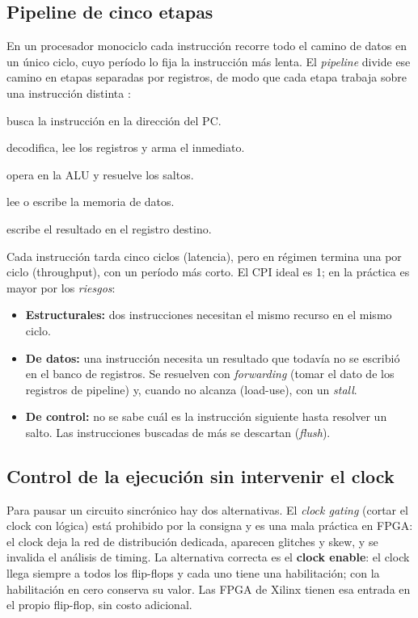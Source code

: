 \documentclass[12pt,a4paper]{article}
\begin{document}
\subsection{Pipeline de cinco etapas}

En un procesador monociclo cada instrucción recorre todo el camino de datos en
un único ciclo, cuyo período lo fija la instrucción más lenta. El
\emph{pipeline} divide ese camino en etapas separadas por registros, de modo que
cada etapa trabaja sobre una instrucción distinta \cite{patterson}:

\begin{description}[nosep,leftmargin=1.5cm,style=sameline]
  \item[IF] busca la instrucción en la dirección del PC.
  \item[ID] decodifica, lee los registros y arma el inmediato.
  \item[EX] opera en la ALU y resuelve los saltos.
  \item[MEM] lee o escribe la memoria de datos.
  \item[WB] escribe el resultado en el registro destino.
\end{description}

Cada instrucción tarda cinco ciclos (latencia), pero en régimen termina una por
ciclo (throughput), con un período más corto. El CPI ideal es 1; en la práctica
es mayor por los \emph{riesgos}:

\begin{itemize}[nosep]
  \item \textbf{Estructurales:} dos instrucciones necesitan el mismo recurso en
        el mismo ciclo.
  \item \textbf{De datos:} una instrucción necesita un resultado que todavía no
        se escribió en el banco de registros. Se resuelven con
        \emph{forwarding} (tomar el dato de los registros de pipeline) y, cuando
        no alcanza (load-use), con un \emph{stall}.
  \item \textbf{De control:} no se sabe cuál es la instrucción siguiente hasta
        resolver un salto. Las instrucciones buscadas de más se descartan
        (\emph{flush}).
\end{itemize}

\subsection{Control de la ejecución sin intervenir el clock}

Para pausar un circuito sincrónico hay dos alternativas. El \emph{clock gating}
(cortar el clock con lógica) está prohibido por la consigna y es una mala
práctica en FPGA: el clock deja la red de distribución dedicada, aparecen
glitches y skew, y se invalida el análisis de timing. La alternativa correcta es
el \textbf{clock enable}: el clock llega siempre a todos los flip-flops y cada
uno tiene una habilitación; con la habilitación en cero conserva su valor. Las
FPGA de Xilinx tienen esa entrada en el propio flip-flop, sin costo adicional.
\end{document}
